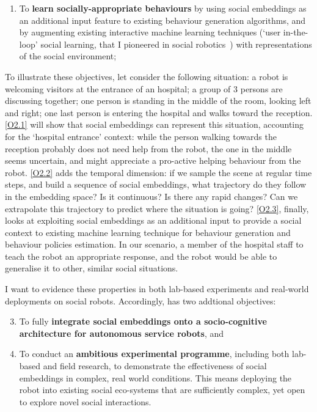 \begin{enumerate}[label=\textbf{(\arabic*)}]
\begin{enumerate}[label=\textbf{O2.\arabic*}]
    \item \label{O2.3} To \textbf{learn socially-appropriate behaviours} by using
        social embeddings as an additional input feature to existing behaviour
        generation algorithms, and by augmenting existing interactive machine
        learning techniques (`user in-the-loop' social learning, that I
        pioneered in social robotics~\cite{winkle2021leador}) with
        representations of the social environment;

\end{enumerate}
\end{enumerate}

\noindent To illustrate these objectives, let consider the following situation:
a robot is welcoming visitors at the entrance of an hospital; a group of 3
persons are discussing together; one person is standing in the middle of the
room, looking left and right; one last person is entering the hospital and walks
toward the reception. \ref{O2.1} will show that social embeddings can represent
this situation, accounting for the `hospital entrance' context: while the person
walking towards the reception probably does not need help from the robot, the
one in the middle seems uncertain, and might appreciate a pro-active helping
behaviour from the robot. \ref{O2.2} adds the temporal dimension: if we sample
the scene at regular time steps, and build a sequence of social embeddings, what
trajectory do they follow in the embedding space? Is it continuous? Is there any
rapid changes? Can we extrapolate this trajectory to predict where the situation
is going? \ref{O2.3}, finally, looks at exploiting social embeddings as an
additional input to provide a social context to existing machine learning
technique for behaviour generation and behaviour policies estimation. In our
scenario, a member of the hospital staff to teach the robot an appropriate
response, and the robot would be able to generalise it to other, similar social
situations.


I want to evidence these properties in both lab-based experiments and
real-world deployments on social robots. Accordingly, \project has two addtional
objectives:

\begin{enumerate}[label=\textbf{O\arabic*}]
    \setcounter{enumi}{2}
    \item \label{O3} To fully {\bf integrate social embeddings onto a
        socio-cognitive architecture for autonomous service robots}, and

    \item \label{O4} To conduct an {\bf ambitious experimental programme},
        including both lab-based and field research, to demonstrate the
        effectiveness of social embeddings in complex, real world conditions.
        This means deploying the \project robot into existing social eco-systems
        that are sufficiently complex, yet open to explore novel social interactions.
\end{enumerate}


